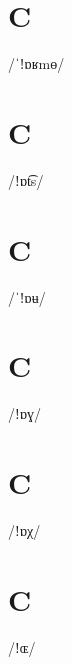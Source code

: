 \documentclass[10pt,a4paper,twoside]{book}
\begin{document}
\section*{C}

\begin{multicols}{3}
 {/ˈǃɒʁmɵ/} {}
\end{multicols}

\section*{C}

\begin{multicols}{3}
 {/ǃɒt͡s/} {}
\end{multicols}

\section*{C}

\begin{multicols}{3}
 {/ˈǃɒʉ/} {}
\end{multicols}

\section*{C}

\begin{multicols}{3}
 {/ǃɒɣ/} {}
\end{multicols}

\section*{C}

\begin{multicols}{3}
 {/ǃɒχ/} {}
\end{multicols}

\section*{C}

\begin{multicols}{3}
 {/ǃɶ/} {}
\end{multicols}
\end{document}
